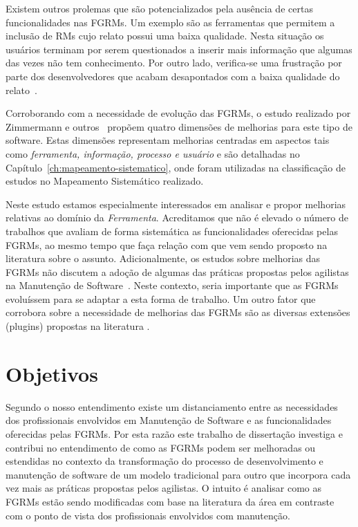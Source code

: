 Existem outros prolemas que são potencializados pela ausência de certas
funcionalidades nas FGRMs. Um exemplo são as ferramentas que permitem a inclusão
de RMs cujo relato possui uma baixa qualidade. Nesta situação os usuários
terminam por serem questionados a inserir mais informação que algumas das vezes
não tem conhecimento. Por outro lado, verifica-se uma frustração por parte dos
desenvolvedores que acabam desapontados com a baixa qualidade do
relato~\cite{just2008towards}.

Corroborando com a necessidade de evolução das FGRMs, o estudo realizado por
Zimmermann e outros~\cite{zimmermann2009improving} propõem quatro dimensões de
melhorias para este tipo de software. Estas dimensões representam melhorias
centradas em aspectos tais como \textit{ferramenta, informação, processo e
    usuário} e são detalhadas no Capítulo~\ref{ch:mapeamento-sistematico}, onde
foram utilizadas na classificação de estudos no Mapeamento Sistemático
realizado.


Neste estudo estamos especialmente interessados em analisar e propor melhorias
relativas ao domínio da \textit{Ferramenta}. Acreditamos que não é elevado o
número de trabalhos que avaliam de forma sistemática as funcionalidades
oferecidas pelas FGRMs, ao mesmo tempo que faça relação com que vem sendo
proposto na li\-te\-ra\-tu\-ra sobre o assunto. Adicionalmente, os estudos sobre
melhorias das FGRMs não discutem a adoção de algumas das práticas propostas
pelos agilistas na Manutenção de Software~\cite{Soltan2016,Devulapally2015,
    Heeager2015}. Neste contexto, seria importante que as FGRMs evoluíssem para
se adaptar a esta forma de trabalho. Um outro fator que corrobora sobre a
necessidade de melhorias das FGRMs são as diversas extensões (plugins) propostas
na literatura
\cite{101186,Thung:2014:BIT:2635868.2661678,Kononenko:2014:DED:2591062.2591075}.

\section{Objetivos}
\label{sec:intro-objetivos}

Segundo o nosso entendimento existe um distanciamento entre as necessidades dos
profissionais envolvidos em Manutenção de Software e as funcionalidades
oferecidas pelas FGRMs\@. Por esta razão este trabalho de dissertação investiga
e contribui no entendimento de como as FGRMs podem ser melhoradas ou estendidas
no contexto da transformação do processo de desenvolvimento e manutenção de
software de um modelo tradicional para outro que incorpora cada vez mais as
práticas propostas pelos agilistas. O intuito é analisar como as FGRMs estão
sendo modificadas com base na literatura da área em contraste com o ponto de
vista dos profissionais envolvidos com manutenção.

